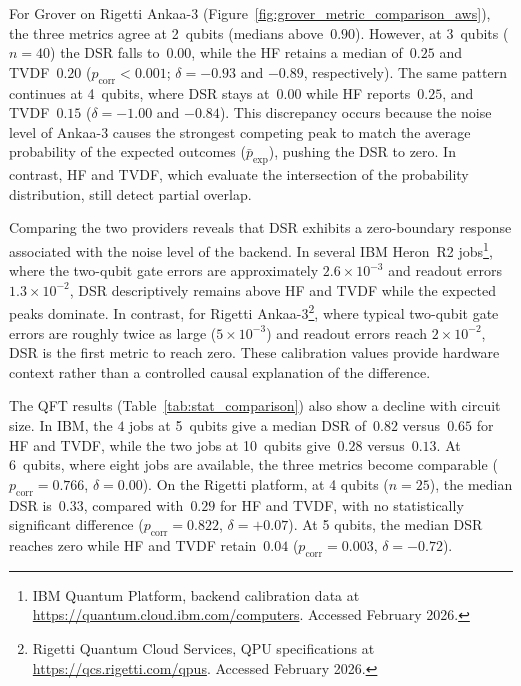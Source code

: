 \documentclass[pdflatex,sn-mathphys-num]{sn-jnl}
\theoremstyle{thmstyleone}%
\theoremstyle{thmstyletwo}%
\theoremstyle{thmstylethree}%
\begin{document}
For Grover on Rigetti Ankaa-3 (Figure~\ref{fig:grover_metric_comparison_aws}), the three metrics agree at 2~qubits (medians above~$0.90$). However, at 3~qubits ($n=40$) the DSR falls to~$0.00$, while the HF retains a median of~$0.25$ and TVDF~$0.20$ ($p_{\text{corr}} < 0.001$; $\delta = -0.93$ and $-0.89$, respectively). The same pattern continues at 4~qubits, where DSR stays at~$0.00$ while HF reports~$0.25$, and TVDF~$0.15$ ($\delta = -1.00$ and $-0.84$). This discrepancy occurs because the noise level of Ankaa-3 causes the strongest competing peak to match the average probability of the expected outcomes ($\bar{p}_{\text{exp}}$), pushing the DSR to zero. In contrast, HF and TVDF, which evaluate the intersection of the probability distribution, still detect partial overlap.

Comparing the two providers reveals that DSR exhibits a zero-boundary response associated with the noise level of the backend. In several IBM Heron~R2 jobs\footnote{IBM Quantum Platform, backend calibration data at \url{https://quantum.cloud.ibm.com/computers}. Accessed February 2026.}, where the two-qubit gate errors are approximately $2.6 \times 10^{-3}$ and readout errors $1.3 \times 10^{-2}$, DSR descriptively remains above HF and TVDF while the expected peaks dominate. In contrast, for Rigetti Ankaa-3\footnote{Rigetti Quantum Cloud Services, QPU specifications at \url{https://qcs.rigetti.com/qpus}. Accessed February 2026.}, where typical two-qubit gate errors are roughly twice as large ($5 \times 10^{-3}$) and readout errors reach $2 \times 10^{-2}$, DSR is the first metric to reach zero. These calibration values provide hardware context rather than a controlled causal explanation of the difference.

The QFT results (Table~\ref{tab:stat_comparison}) also show a decline with circuit size. In IBM, the $4$ jobs at 5~qubits give a median DSR of~$0.82$ versus~$0.65$ for HF and TVDF, while the two jobs at 10~qubits give~$0.28$ versus~$0.13$. At 6~qubits, where eight jobs are available, the three metrics become comparable ($p_{\text{corr}} = 0.766$, $\delta = 0.00$). On the Rigetti platform, at 4 qubits ($n=25$), the median DSR is~$0.33$, compared with~$0.29$ for HF and TVDF, with no statistically significant difference ($p_{\text{corr}} = 0.822$, $\delta = +0.07$). At 5 qubits, the median DSR reaches zero while HF and TVDF retain~$0.04$ ($p_{\text{corr}} = 0.003$, $\delta = -0.72$).
\end{document}
